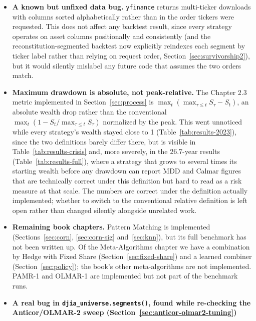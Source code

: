 \documentclass[11pt]{article}
\begin{document}
\begin{itemize}
    single segment of 4,906 periods, it has not been completed. Making it
    cheap would mean revisiting the stateless, no-cached-state design that
    Section~\ref{sec:ons} deliberately chose.
    \item \textbf{A known but unfixed data bug.} \texttt{yfinance} returns
    multi-ticker downloads with columns sorted alphabetically rather than
    in the order tickers were requested. This does not affect any
    backtest result, since every strategy operates on asset columns
    positionally and consistently (and the reconstitution-segmented
    backtest now explicitly reindexes each segment by ticker label rather
    than relying on request order, Section~\ref{sec:survivorship2}), but
    it would silently mislabel any future code that assumes the two
    orders match.
    \item \textbf{Maximum drawdown is absolute, not peak-relative.} The
    Chapter 2.3 metric implemented in Section~\ref{sec:process} is
    $\max_t(\max_{\tau \leq t} S_\tau - S_t)$, an absolute wealth
    drop rather than the conventional $\max_t(1 - S_t / \max_{\tau \leq t}
    S_\tau)$ normalized by the peak. This went unnoticed while every
    strategy's wealth stayed close to 1 (Table~\ref{tab:results-2023}),
    since the two definitions barely differ there, but is visible in
    Table~\ref{tab:results-crisis} and, more severely, in the 26.7-year
    results (Table~\ref{tab:results-full}), where a strategy that grows
    to several times its starting wealth before any drawdown can report
    MDD and Calmar figures that are technically correct under this
    definition but hard to read as a risk measure at that scale. The
    numbers are correct under the definition actually implemented;
    whether to switch to the conventional relative definition is left
    open rather than changed silently alongside unrelated work.
    \item \textbf{Remaining book chapters.} Pattern Matching is implemented
    (Sections~\ref{sec:corn}, \ref{sec:corn-sig} and~\ref{sec:knn}), but
    its full benchmark has not been written up. Of the Meta-Algorithms chapter we have a
    combination by Hedge with Fixed Share (Section~\ref{sec:fixed-share})
    and a learned combiner (Section~\ref{sec:policy}); the book's other
    meta-algorithms are not implemented. PAMR-1 and OLMAR-1 are
    implemented but not part of the benchmark runs.
    \item \textbf{A real bug in \texttt{djia\_universe.segments()}, found
    while re-checking the Anticor/OLMAR-2 sweep (Section~\ref{sec:anticor-olmar2-tuning})
}
\end{itemize}
\end{document}
